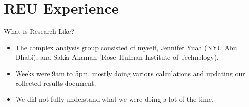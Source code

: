 \documentclass{reu_beamer}
\begin{document}
\section{REU Experience}
\begin{frame}{What is Research Like?}
  \begin{itemize}
    \item The complex analysis group consisted of myself, Jennifer Yuan (NYU Abu Dhabi), and Sakia Akamah (Rose--Hulman Institute of Technology).
    \item Weeks were 9am to 5pm, mostly doing various calculations and updating our collected results document.
    \item We did not fully understand what we were doing a lot of the time.
  \end{itemize}
\end{frame}
\end{document}
